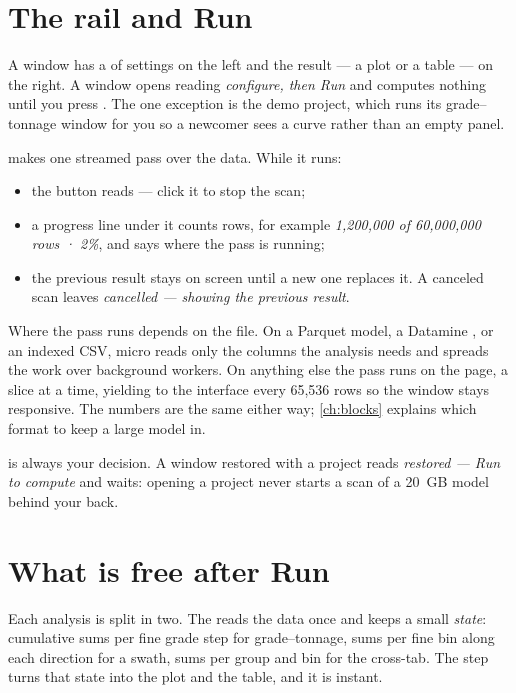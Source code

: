 
\section{The rail and Run}\label{sec:analysis-run}
A window has a  of settings on the left and the result — a plot or a table — on the right. A window opens reading \emph{configure, then Run} and computes nothing until you press . The one exception is the demo project, which runs its grade–tonnage window for you so a newcomer sees a curve rather than an empty panel.

 makes one streamed pass over the data. While it runs:

\begin{itemize}
\item the button reads  — click it to stop the scan;
\item a progress line under it counts rows, for example \emph{1,200,000 of 60,000,000 rows · 2\%}, and says where the pass is running;
\item the previous result stays on screen until a new one replaces it. A canceled scan leaves \emph{cancelled — showing the previous result}.
\end{itemize}

Where the pass runs depends on the file. On a Parquet model, a Datamine , or an indexed CSV, micro reads only the columns the analysis needs and spreads the work over background workers. On anything else the pass runs on the page, a slice at a time, yielding to the interface every 65,536 rows so the window stays responsive. The numbers are the same either way; \cref{ch:blocks} explains which format to keep a large model in.

\begin{note}
 is always your decision. A window restored with a project reads \emph{restored — Run to compute} and waits: opening a project never starts a scan of a 20~GB model behind your back.
\end{note}

\section{What is free after Run}\label{sec:analysis-free}
Each analysis is split in two. The  reads the data once and keeps a small \emph{state}: cumulative sums per fine grade step for grade–tonnage, sums per fine bin along each direction for a swath, sums per group and bin for the cross-tab. The  step turns that state into the plot and the table, and it is instant.

